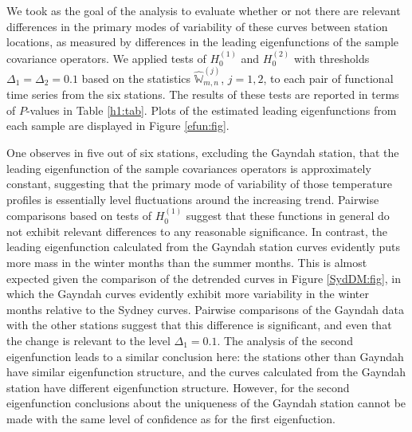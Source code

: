 \documentclass[11pt]{article}
\numberwithin{equation}{section}
\numberwithin{theorem}{section}
\numberwithin{lemma}{section}
\numberwithin{proposition}{section}
\numberwithin{cor}{section}
\numberwithin{definition}{section}
\numberwithin{cons}{section}
\numberwithin{rem}{section}
\numberwithin{exa}{section}
\numberwithin{table}{section}
\numberwithin{figure}{section}
\numberwithin{algo}{section}
\begin{document}
{{We took as the goal of the analysis to evaluate whether or not there are relevant differences in the primary modes of variability of these curves between station locations, as measured by differences in the leading eigenfunctions of the sample covariance operators. We applied tests of $H_0^{(1)}$ and $H_0^{(2)}$ with thresholds $\Delta_1=\Delta_2=0.1$ based on the statistics $\hat{\mathbb{W}}^{(j)}_{m,n}$, $j=1,2$, to each pair of functional time series from the six stations. The results of these tests are reported in terms of $P$-values in Table \ref{h1:tab}. Plots of the estimated leading eigenfunctions from each sample are displayed in Figure \ref{efun:fig}.

One observes in five out of six stations, excluding the Gayndah station, that the leading eigenfunction of the sample covariances operators is approximately constant, suggesting that the primary mode of variability of those temperature profiles is essentially level fluctuations around the increasing trend. Pairwise comparisons based on tests of $H_0^{(1)}$ suggest that these functions in general do not exhibit relevant differences to any reasonable significance. In contrast, the leading eigenfunction calculated from the Gayndah station curves evidently puts more mass in the winter months than the summer months. This is almost expected given the comparison of the detrended curves in Figure \ref{SydDM:fig}, in which the Gayndah curves evidently exhibit more variability in the winter months relative to the Sydney curves. Pairwise comparisons of the Gayndah data with the other stations suggest that this difference is significant, and even that the change is relevant to the level $\Delta_1=0.1$. The analysis of the second eigenfunction leads to a similar conclusion here: the stations other than Gayndah have similar eigenfunction structure, and the curves calculated from the Gayndah station have different eigenfunction structure. However, for the second eigenfunction conclusions about the uniqueness of the Gayndah station cannot be made with the same level of confidence as for the first eigenfuction.



}}
\end{document}
